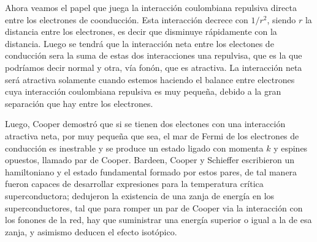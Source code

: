 Ahora veamos el papel que juega la interacción coulombiana repulsiva directa entre los electrones de coonducción. Esta interacción decrece con $1/r^2$, siendo $r$ la distancia entre los electrones, es decir que disminuye rápidamente con la distancia. Luego se tendrá que la interacción neta entre los electones de conducción sera la suma de estas dos interacciones una repulvisa, que es la que podríamos decir normal y otra, vía fonón, que es atractiva. La interacción neta será atractiva solamente cuando estemos haciendo el balance entre electrones cuya interacción coulombiana repulsiva es muy pequeña, debido a la gran separación que hay entre los electrones.

Luego, Cooper demostró que si se tienen dos electones con una interacción atractiva neta, por muy pequeña que sea, el mar de Fermi de los electrones de conducción es inestrable y se produce un estado ligado con momenta $k$ y espines opuestos, llamado par de Cooper. Bardeen, Cooper y Schieffer escribieron un hamiltoniano y el estado fundamental formado por estos pares, de tal manera fueron capaces de desarrollar expresiones para la temperatura crítica superconductora; dedujeron la existencia de una zanja de energía en los superconductores, tal que para romper un par de Cooper via la interacción con los fonones de la red, hay que suministrar una energía superior o igual a la de esa zanja, y asimismo deducen el efecto isotópico.

